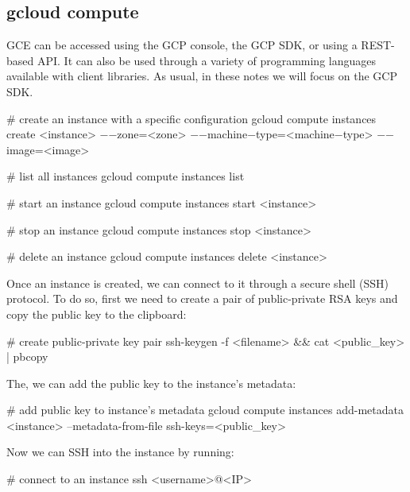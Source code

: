 \subsection{gcloud compute}

GCE can be accessed using the GCP console, the GCP SDK, or using a REST-based API. It can also be used through a variety
of programming languages available with client libraries. As usual, in these notes we will focus on the GCP SDK\@.

\begin{bash}
# create an instance with a specific configuration
gcloud compute instances create <instance> $-$$-$zone=<zone> $-$$-$machine$-$type=<machine$-$type> $-$$-$image=<image>
\end{bash}

\begin{bash}
# list all instances
gcloud compute instances list
\end{bash}

\begin{bash}
# start an instance
gcloud compute instances start <instance>
\end{bash}

\begin{bash}
# stop an instance
gcloud compute instances stop <instance>
\end{bash}

\begin{bash}
# delete an instance
gcloud compute instances delete <instance>
\end{bash}

Once an instance is created, we can connect to it through a secure shell (SSH) protocol. To do so, first we need to
create a pair of public-private RSA keys and copy the public key to the clipboard:
\begin{bash}
# create public-private key pair
ssh-keygen -f <filename> && cat <public_key> | pbcopy
\end{bash}

The, we can add the public key to the instance's metadata:
\begin{bash}
# add public key to instance's metadata
gcloud compute instances add-metadata <instance> --metadata-from-file ssh-keys=<public_key>
\end{bash}

Now we can SSH into the instance by running:
\begin{bash}
# connect to an instance
ssh <username>@<IP>
\end{bash}

